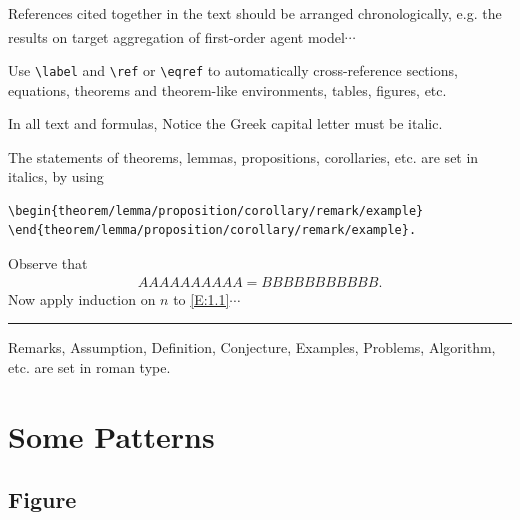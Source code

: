\documentclass{jssc}
\newcommand*\supercite[1]{\textsuperscript{\cite{#1}}}
\newcommand{\rulex}{\hfill\rule{1mm}{3mm}}
\def\ay{\arraycolsep=1.5pt}
\begin{document}
References cited together in the text should be arranged
chronologically, e.g. the results on target aggregation of
first-order agent model\supercite{ref3}$\cdots$

Use \verb|\label| and \verb|\ref| or \verb|\eqref| to automatically
cross-reference sections, equations, theorems and theorem-like
environments, tables, figures, etc.

In all text and formulas, Notice the Greek capital letter must be
italic.

\begin{theorem} \label{th:1.1} %
The statements of theorems, lemmas, propositions, corollaries, etc.
are set in italics, by using
\begin{verbatim}
\begin{theorem/lemma/proposition/corollary/remark/example}
\end{theorem/lemma/proposition/corollary/remark/example}.
\end{verbatim}
\end{theorem}

\proof Observe that \ay
\begin{eqnarray}\label{E:1.1}
AAAAAAAAAA = BBBBBBBBBBB.
\end{eqnarray}
Now apply induction on $n$ to \eqref{E:1.1}$\cdots$   \rulex


\begin{remark}\label{re:1.2}
Remarks, Assumption, Definition, Conjecture, Examples, Problems,
Algorithm, etc. are set in roman type.
\end{remark}

\section{Some Patterns}

\subsection{Figure}

\end{document}
